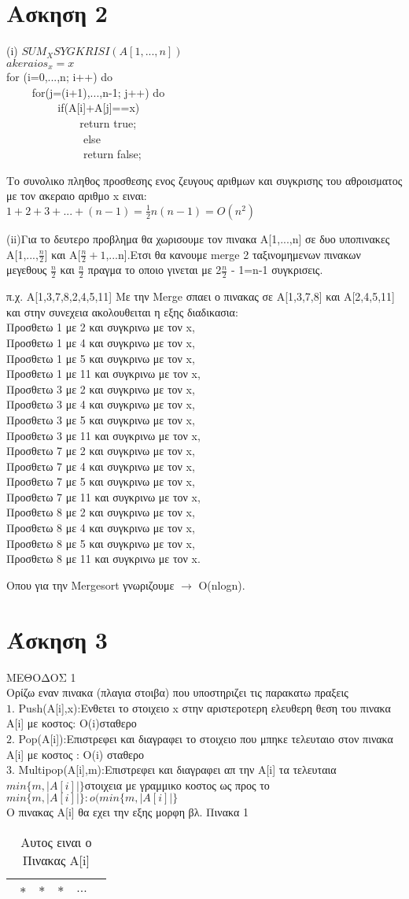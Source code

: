 \documentclass[12pt]{article}
\begin{document}
$$ $$
\section{Ασκηση 2}
(i) $SUM_XSYGKRISI(A[1,...,n])$$$ $$
$    akeraios_x=x $ $$ $$
    for (i=0,...,n; i++) do $$ $$
    $\qquad$	for(j=(i+1),...,n-1; j++) do$$ $$
    $\qquad$ $\qquad$	if(A[i]+A[j]==x) $$ $$
    $\qquad$ $\qquad$ $\qquad$return true; $$ $$
    $\qquad$ $\qquad$ $\qquad$	else$$ $$
   $\qquad$ $\qquad$ $\qquad$    return false;$$ $$ $$ $$
    	
    	Το συνολικο πληθος προσθεσης ενος ζευγους αριθμων και συγκρισης του αθροισματος με τον ακεραιο αριθμο x ειναι:$$ $$
    	$1+2+3+...+(n-1)=\frac{1}{2} n (n-1)=O(n^2)$ $$ $$ $$  $$
    	
    	
(ii)Για το δευτερο προβλημα θα χωρισουμε τον πινακα Α[1,...,n] σε δυο υποπινακες Α[1,...,$\frac{n}{2}$] και Α[$\frac{n}{2}+1$,...n].Ετσι θα κανουμε merge 2 ταξινομημενων πινακων μεγεθους $\frac{n}{2}$ και $\frac{n}{2}$ πραγμα το οποιο γινεται με 2$\frac{n}{2}$ - 1=n-1 συγκρισεις.$$ $$

π.χ. Α[1,3,7,8,2,4,5,11]
Mε την Merge σπαει ο πινακας σε Α[1,3,7,8] και A[2,4,5,11]$$ $$
και στην συνεχεια ακολουθειται η εξης διαδικασια:$$ $$
Προσθετω 1 με 2 και συγκρινω με τον x,$$ $$
Προσθετω 1 με 4 και συγκρινω με τον x,$$ $$
Προσθετω 1 με 5 και συγκρινω με τον x,$$ $$ 
Προσθετω 1 με 11 και συγκρινω με τον x,$$ $$
Προσθετω 3 με 2 και συγκρινω με τον x,$$ $$
Προσθετω 3 με 4 και συγκρινω με τον x,$$ $$
Προσθετω 3 με 5 και συγκρινω με τον x,$$ $$
Προσθετω 3 με 11 και συγκρινω με τον x,$$ $$
Προσθετω 7 με 2 και συγκρινω με τον x,$$ $$
Προσθετω 7 με 4 και συγκρινω με τον x,$$ $$
Προσθετω 7 με 5 και συγκρινω με τον x,$$$$
Προσθετω 7 με 11 και συγκρινω με τον x,$$$$
Προσθετω 8 με 2 και συγκρινω με τον x,$$$$
Προσθετω 8 με 4 και συγκρινω με τον x,$$$$
Προσθετω 8 με 5 και συγκρινω με τον x,$$$$
Προσθετω 8 με 11 και συγκρινω με τον x.$$$$ $$$$

Οπου για την Mergesort γνωριζουμε  $\to$ Ο(nlogn).

\section{Άσκηση 3}
ΜΕΘΟΔΟΣ 1$$ $$
Ορίζω εναν πινακα (πλαγια στοιβα) που υποστηριζει τις παρακατω πραξεις $$ $$
$1. $ Push(A[i],x):Ενθετει το στοιχειο x στην αριστεροτερη ελευθερη θεση του πινακα Α[i] με κοστος: Ο(i)σταθερο $$ $$
$2. $ Pop(A[i]):Επιστρεφει και διαγραφει το στοιχειο που μπηκε τελευταιο στον πινακα Α[i] με κοστος : Ο(i) σταθερο $$ $$
$3. $ Multipop(A[i],m):Επιστρεφει και διαγραφει απ την Α[i] τα τελευταια $ min\{m,|A[i]|\} $στοιχεια με γραμμικο κοστος ως προς το $min\{m,|A[i]|\}: o(min\{m,|A[i]|\}$ $$ $$
$$ $$
Ο πινακας Α[i] θα εχει την εξης μορφη βλ. Πινακα 1
\begin{table}[H]
\begin{center}
\caption{Αυτος ειναι ο Πινακας A[i]}\label{tbl:1}
\begin{tabular}{|l|c|r|c|l|}
\hline
\ $*$ & $*$ & $*$ & $...$ & $  $\\
\hline
\end{tabular}
\end{center}
\end{table}
$$ $$ 
\end{document}
